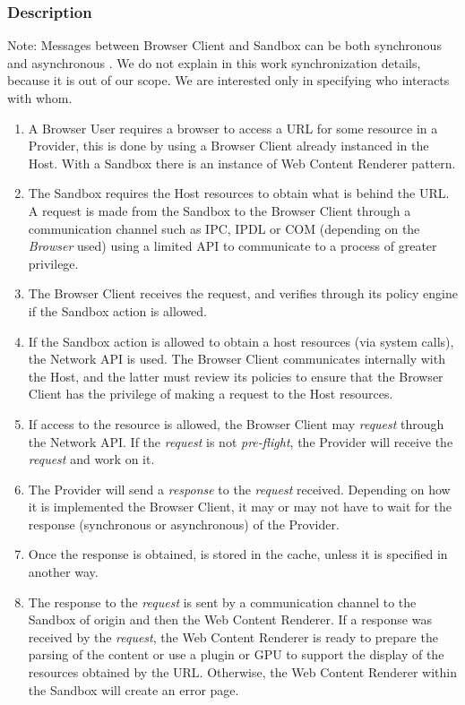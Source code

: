 \documentclass{sig-alternate-05-2015}
\begin{document}
    \subsubsection*{Description}
    Note: Messages between Browser Client and Sandbox can be both synchronous and asynchronous \cite{firefoxIPC,GCIPC}. We do not explain in this work synchronization details, because it is out of our scope. We are interested only in specifying who interacts with whom.
      \begin{enumerate}
        \item A Browser User requires a browser to access a URL for some resource in a Provider, this is done by using a Browser Client already instanced in the Host. With a Sandbox there is an instance of Web Content Renderer pattern.
        \item The Sandbox requires the Host resources to obtain what is behind the URL. A request is made from the Sandbox to the Browser Client through a communication channel such as IPC, IPDL or COM (depending on the \textit{Browser} used) using a limited API to communicate to a process of greater privilege.
        \item The Browser Client receives the request, and verifies through its policy engine if the Sandbox action is allowed.
        \item If the Sandbox action is allowed to obtain a host resources (via system calls), the Network API is used. The Browser Client communicates internally with the Host, and the latter must review its policies to ensure that the Browser Client has the privilege of making a request to the Host resources.
        \item If access to the resource is allowed, the Browser Client may \textit{request} through the Network API. If the \textit{request} is not \textit{pre-flight}, the Provider will receive the \textit{request} and work on it.
        \item The Provider will send a \textit{response} to the \textit{request} received. Depending on how it is implemented the Browser Client, it may or may not have to wait for the response (synchronous or asynchronous) of the Provider.
        \item Once the response is obtained, is stored in the cache, unless it is specified in another way.
        \item The response to the \textit{request} is sent by a communication channel to the Sandbox of origin and then the Web Content Renderer. If a response was received by the \textit{request}, the Web Content Renderer is ready to prepare the parsing of the content or use a plugin or GPU to support the display of the resources obtained by the URL. Otherwise, the Web Content Renderer within the Sandbox will create an error page.

\end{enumerate}
\end{document}
